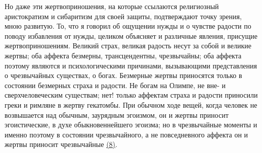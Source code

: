 \documentclass[12pt]{article}
\begin{document}
Но даже эти жертвоприношения, на которые ссылаются религиозный аристократизм и сибаритизм для своей защиты, подтверждают точку зрения, мною развитую. То, что я говорил об ощущении нужды и о чувстве радости по поводу избавления от нужды, целиком объясняет и различные явления, присущие жертвоприношениям. Великий страх, великая радость несут за собой и великие жертвы; оба аффекта безмерны, трансцендентны, чрезвычайны; оба аффекта поэтому являются и психологическими причинами, вызывающими представления о чрезвычайных существах, о богах. Безмерные жертвы приносятся только в состоянии безмерных страха и радости. Не богам на Олимпе, не вне- и сверхчеловеческим существам; нет! только аффектам страха и радости приносили греки и римляне в жертву гекатомбы. При обычном ходе вещей, когда человек не возвышается над обычным, заурядным эгоизмом, он и жертвы приносит эгоистические, в духе обыкновеннейшего эгоизма; но в чрезвычайные моменты и именно поэтому в состоянии чрезвычайного, а не повседневного аффекта он и жертвы приносит чрезвычайные \hyperlink{8}{(8)}\hypertarget{b8}{}.
\end{document}
